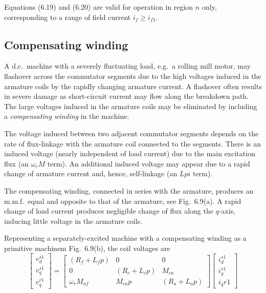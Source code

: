 \documentclass[a4paper,numbers=noenddot,12pt]{scrbook}
\begin{document}
        Equations (6.19) and (6.20) are valid for operation in region $n$ only, corresponding to a range of field current $i_f \geq i_{f1}$.

        \subsection{Compensating winding}
        A d.c.\ machine with a severely fluctuating load, e.g.\ a rolling mill motor, may flashover across the commutator segments due to the high voltages induced in the armature coils by the rapidly changing armature current. A flashover often results in severe damage as short-circuit current may flow along the breakdown path. The large voltages induced in the armature coils may be eliminated by including a \textit{compensating winding} in the machine.

        The voltage induced between two adjacent commutator segments depends on the rate of flux-linkage with the armature coil connected to the segments. There is an induced voltage (nearly independent of load current) due to the main excitation flux (an $\omega_r M$ term). An additional induced voltage may appear due to a rapid change of armature current and, hence, self-linkage (an $L p i$ term).

        The compensating winding, connected in series with the armature, produces an m.m.f.\ equal and opposite to that of the armature, see Fig.\ 6.9(a). A rapid change of load current produces negligible change of flux along the $q$-axis, inducing little voltage in the armature coils.

        Representing a separately-excited machine with a compensating winding as a primitive machinem Fig.\ 6.9(b), the coil voltages are
        \begin{equation}
            \begin{bmatrix}
                v_d^{s1} \\[2ex] v_q^{s1} \\[2ex] v_q^{r1}
            \end{bmatrix} = 
            \begin{bmatrix}
                (R_f + L_f p) & 0 & 0 \\[2ex]
                0 & (R_c + L_c p) & M_{ca} \\[2ex]
                \omega_r M_{af} & M_{ca} p & (R_a + L_a p)
            \end{bmatrix}
            \begin{bmatrix}
                i_d^{s1} \\[2ex] i_q^{s1} \\[2ex] i_q{r1}
            \end{bmatrix}
            \label{}
        \end{equation}
\end{document}
